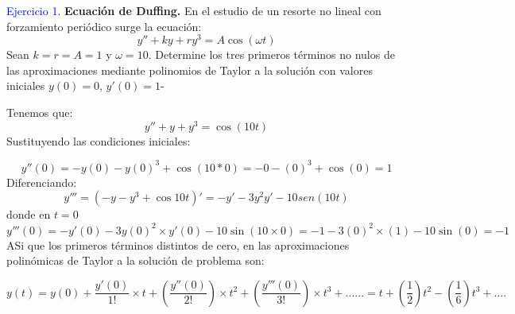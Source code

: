 \textcolor{blue}{Ejercicio 1.}
\textbf{Ecuación de Duffing.} En el estudio de un resorte no lineal con forzamiento periódico surge la ecuación:
$$y''+ky+ry^3=A\cos{(\omega t)}$$
Sean $k=r=A=1$ y $\omega=10$. Determine los tres primeros términos no nulos de las aproximaciones mediante polinomios de Taylor a la solución con valores iniciales $y(0)=0$, $y'(0)=1$-

Tenemos que:
$$y''+y+y^3=\cos{(10t)}$$
Sustituyendo las condiciones iniciales:

$$y''(0) = -y (0) - y (0) ^ 3 + \cos (10 * 0) = -0 - (0) ^ 3 + \cos (0) = 1$$
Diferenciando:
$$y'''= (-y -y ^ 3 + \cos10t)' = -y'-3y^2 y'-10sen(10t)$$
donde en $t=0$
$$y'''(0) = -y' (0) -3y (0) ^ 2 \times y '(0) -10\sin (10 \times 0) = -1-3 (0) ^ 2 \times (1) -10 \sin(0) = -1$$
ASi que los primeros términos distintos de cero, en las aproximaciones polinómicas de Taylor a la solución de problema son:

$$y(t) = y(0)+\frac{y'(0)}{1!}\times t + (\frac{y''(0)}{2!})\times t ^ 2 + (\frac{y'''(0)}{3!})\times t ^ 3 + ...... = t + (\frac{1}{2}) t ^ 2 - (\frac{1}{6}) t ^ 3 + ....$$